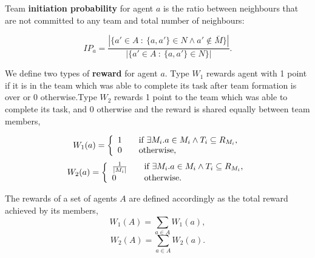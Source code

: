 \documentclass{llncs}
\begin{document}
\begin{definition}
Team \textbf{initiation probability} for agent $a$ is the ratio between neighbours that are not committed to any team and total number of neighbours:

\begin{equation}
IP_a = \frac{|\{ a' \in A\ :\ \{a, a'\} \in N \wedge a' \notin \bar{M}  \}|}{|\{ a' \in A\ :\ \{a, a'\} \in N \}|}.
\label{eq:init_prob}
\end{equation}

\end{definition}

\begin{definition}
We define two types of \textbf{reward} for agent $a$. Type $W_1$ rewards agent with 1 point if it is in the team which was able to complete its task after team formation is over or 0 otherwise.Type $W_2$ rewards 1 point to the team which was able to complete its task, and 0 otherwise and the reward is shared equally between team members,

\begin{equation}
W_1(a) = \left\{
  \begin{array}{l l}
    1 & \quad \text{if $\exists M_i . a \in M_i \wedge T_i \subseteq R_{M_i}$,}\\
    0 & \quad \text{otherwise,}\\
  \end{array} \right.
\label{eq:w1agent}
\end{equation}
\begin{equation}
W_2(a) = \left\{
  \begin{array}{l l}
    \frac{1}{|M_i|} & \quad \text{if $\exists M_i . a \in M_i \wedge T_i \subseteq R_{M_i}$,}\\
    0 & \quad \text{otherwise.}\\
  \end{array} \right.
\label{eq:w2agent}
\end{equation}

The rewards of a set of agents $A$ are defined accordingly as the total reward achieved by its members,
\begin{equation}
 W_1(A) = \sum_{a \in A} W_1(a),
\label{eq:w1organisation}
\end{equation}
\begin{equation}
 W_2(A) = \sum_{a \in A} W_2(a).
\label{eq:w2organisation}
\end{equation}

\end{definition}
\end{document}
